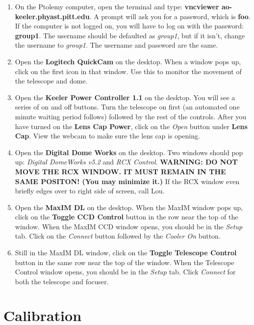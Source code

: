 \documentclass[11pt]{report}
\begin{document}
\begin{enumerate}
\item On the Ptolemy computer, open the terminal and type: {\bf vncviewer ao-keeler.phyast.pitt.edu}. A prompt will ask you for a password, which is {\bf foo}. If the computer is not logged on, you will have to log on with the password: {\bf group1}. The username should be defaulted as \emph{group1}, but if it isn't, change the username to \emph{group1}. The username and password are the same. 
\item Open the {\bf Logitech QuickCam} on the desktop. When a window pops up, click on the first icon in that window. Use this to monitor the movement of the telescope and dome.
\item Open the {\bf Keeler Power Controller 1.1} on the desktop. You will see a series of on and off buttons. Turn the telescope on first (an automated one minute waiting period follows) followed by the rest of the controls. After you have turned on the {\bf Lens Cap Power}, click on the \emph{Open} button under {\bf Lens Cap}. View the webcam to make sure the lens cap is opening. 
\item Open the {\bf Digital Dome Works} on the desktop. Two windows should pop up: \emph{Digital DomeWorks v5.2} and \emph{RCX Control}. {\bf WARNING: DO NOT MOVE THE RCX WINDOW. IT MUST REMAIN IN THE SAME POSITON! (You may minimize it.)} If the RCX window even briefly edges over to right side of screen, call Lou. 
\item Open the {\bf MaxIM DL} on the desktop. When the MaxIM window pops up, click on the {\bf Toggle CCD Control} button in the row near the top of the window. When the MaxIM CCD window opens, you should be in the \emph{Setup} tab. Click on the \emph{Connect} button followed by the \emph{Cooler On} button. 
\item Still in the MaxIM DL window, click on the {\bf Toggle Telescope Control} button in the same row near the top of the window. When the Telescope Control window opens, you should be in the \emph{Setup} tab. Click \emph{Connect} for both the telescope and focuser.
\end{enumerate}

\section{Calibration}
\end{document}
